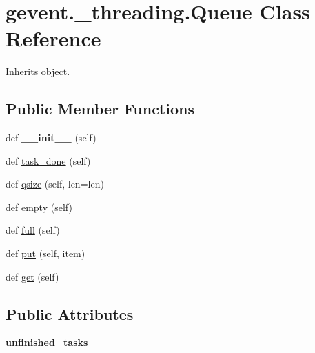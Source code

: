\hypertarget{classgevent_1_1__threading_1_1_queue}{}\section{gevent.\+\_\+threading.\+Queue Class Reference}
\label{classgevent_1_1__threading_1_1_queue}


Inherits object.

\subsection*{Public Member Functions}
\begin{DoxyCompactItemize}
\item 
\mbox{\label{classgevent_1_1__threading_1_1_queue_ab0b8b1d56a88bd86156e20fb356b8e3e}} 
def {\bfseries \+\_\+\+\_\+init\+\_\+\+\_\+} (self)
\item 
def \hyperlink{classgevent_1_1__threading_1_1_queue_ac2bdb2617cbb9f62a7ee9d68b8871144}{task\+\_\+done} (self)
\item 
def \hyperlink{classgevent_1_1__threading_1_1_queue_a74699231ed7c72d44dcb373908ad7af8}{qsize} (self, len=len)
\item 
def \hyperlink{classgevent_1_1__threading_1_1_queue_a0562fa76a39f3e5746fe9105031bca66}{empty} (self)
\item 
def \hyperlink{classgevent_1_1__threading_1_1_queue_a6061d745b1d271818d7aa2dbb17b6c0f}{full} (self)
\item 
def \hyperlink{classgevent_1_1__threading_1_1_queue_aefbf185463e87620fab548b6b7865d60}{put} (self, item)
\item 
def \hyperlink{classgevent_1_1__threading_1_1_queue_a95b0b413654f9fa7a435f2ef20a5199b}{get} (self)
\end{DoxyCompactItemize}
\subsection*{Public Attributes}
\begin{DoxyCompactItemize}
\item 
\mbox{\label{classgevent_1_1__threading_1_1_queue_ae2345cf8f5768164e458b531f934d375}} 
{\bfseries unfinished\+\_\+tasks}
\end{DoxyCompactItemize}


